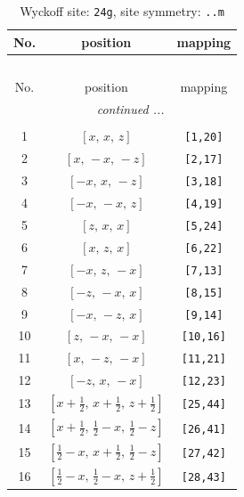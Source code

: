 \documentclass[fleqn,8pt]{jsarticle}
\begin{document}
\begin{longtable}{ccc}
\caption{Wyckoff site: {\tt 24g}, site symmetry: {\tt ..m}}
 \\
 \hline \hline
No. & position & mapping \\ \hline \endfirsthead

\multicolumn{2}{l}{\tablename\ \thetable{}} \\
 \hline \hline
No. & position & mapping \\ \hline \endhead

 \hline \hline
\multicolumn{2}{r}{\footnotesize\it continued ...} \\ \endfoot

 \hline \hline
\multicolumn{2}{r}{} \\ \endlastfoot

1 & $\left[ x,\, x,\, z \right]$ & {\tt [1,20]} \\ \hline
2 & $\left[ x,\, - x,\, - z \right]$ & {\tt [2,17]} \\ \hline
3 & $\left[ - x,\, x,\, - z \right]$ & {\tt [3,18]} \\ \hline
4 & $\left[ - x,\, - x,\, z \right]$ & {\tt [4,19]} \\ \hline
5 & $\left[ z,\, x,\, x \right]$ & {\tt [5,24]} \\ \hline
6 & $\left[ x,\, z,\, x \right]$ & {\tt [6,22]} \\ \hline
7 & $\left[ - x,\, z,\, - x \right]$ & {\tt [7,13]} \\ \hline
8 & $\left[ - z,\, - x,\, x \right]$ & {\tt [8,15]} \\ \hline
9 & $\left[ - x,\, - z,\, x \right]$ & {\tt [9,14]} \\ \hline
10 & $\left[ z,\, - x,\, - x \right]$ & {\tt [10,16]} \\ \hline
11 & $\left[ x,\, - z,\, - x \right]$ & {\tt [11,21]} \\ \hline
12 & $\left[ - z,\, x,\, - x \right]$ & {\tt [12,23]} \\ \hline
13 & $\left[ x + \frac{1}{2},\, x + \frac{1}{2},\, z + \frac{1}{2} \right]$ & {\tt [25,44]} \\ \hline
14 & $\left[ x + \frac{1}{2},\, \frac{1}{2} - x,\, \frac{1}{2} - z \right]$ & {\tt [26,41]} \\ \hline
15 & $\left[ \frac{1}{2} - x,\, x + \frac{1}{2},\, \frac{1}{2} - z \right]$ & {\tt [27,42]} \\ \hline
16 & $\left[ \frac{1}{2} - x,\, \frac{1}{2} - x,\, z + \frac{1}{2} \right]$ & {\tt [28,43]} \\ \hline

\end{longtable}
\end{document}
